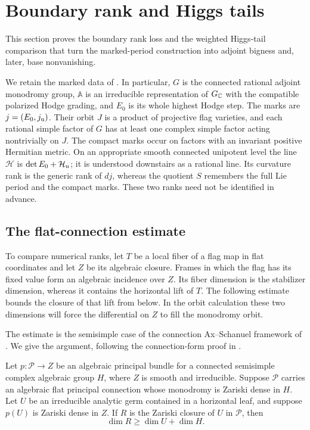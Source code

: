 \section{Boundary rank and Higgs tails}\label{sec:boundary-rank}

This section proves the boundary rank loss and the weighted Higgs-tail
comparison that turn the marked-period construction into adjoint
bigness and, later, base nonvanishing.

We retain the marked data of .  In particular,
$G$ is the connected rational adjoint monodromy group, $\mathbb A$ is an
irreducible representation of $G_{\mathbb C}$ with the compatible polarized
Hodge grading, and $E_0$ is its whole highest Hodge step.  The marks are
$j=(E_0,j_{\rm u})$.  Their orbit $J$ is a product of projective flag
varieties, and each rational simple factor of $G$ has at least one
complex simple factor acting nontrivially on $J$.  The compact marks
occur on factors with an invariant positive Hermitian metric.  On an
appropriate smooth connected unipotent level the line $\mathcal H$ is
$\det E_0+\mathcal H_{\rm u}$; it is understood downstairs as a rational
line.  Its curvature rank is the generic rank of $dj$, whereas the
quotient $S$ remembers the full Lie period and the compact marks.
These two ranks need not be identified in advance.

\subsection{The flat-connection estimate}

To compare numerical ranks, let $T$ be a local fiber of a flag map in
flat coordinates and let $Z$ be its algebraic closure.  Frames in which
the flag has its fixed value form an algebraic incidence over $Z$.
Its fiber dimension is the stabilizer dimension, whereas it contains
the horizontal lift of $T$.  The following estimate bounds the closure
of that lift from below.  In the orbit calculation these two dimensions
will force the differential on $Z$ to fill the monodromy orbit.

The estimate is the semisimple case of the connection Ax--Schanuel
framework of \cite[Theorem~A, Theorem~3.6, and Remark~3.7]{BCFN}.
We give the argument, following the connection-form proof in
\cite[\S3.1]{BCFN}.

\begin{lemma}\label{lem:connection-dimension}
Let $p:\mathcal P\to Z$ be an algebraic principal bundle for a connected
semisimple complex algebraic group $H$, where $Z$ is smooth and
irreducible.  Suppose $\mathcal P$ carries an algebraic flat principal
connection whose monodromy is Zariski dense in $H$.  Let $U$ be an
irreducible analytic germ contained in a horizontal leaf, and suppose
$p(U)$ is Zariski dense in $Z$.  If $R$ is the Zariski closure of $U$ in
$\mathcal P$, then
\begin{equation}\label{eq:prelim-horizontal-dimension}
 \dim R\geq\dim U+\dim H.
\end{equation}
\end{lemma}

